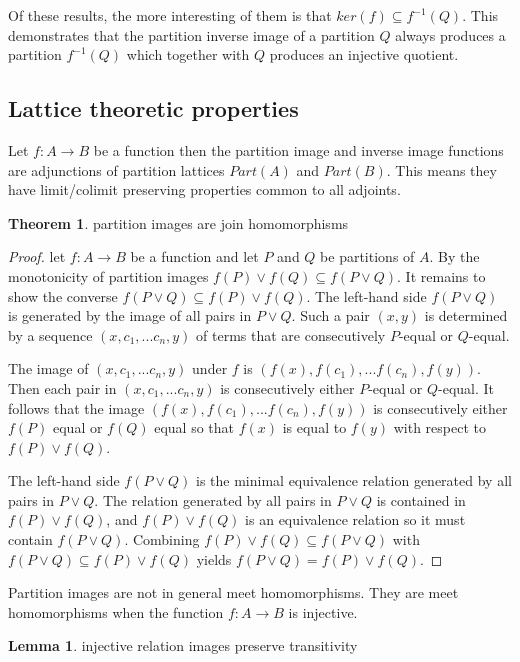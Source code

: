 \documentclass[a4paper,11pt, notitlepage]{report}
\theoremstyle{definition}
\newtheorem{theorem}{Theorem}[section]
\newtheorem{lemma}{Lemma}[section]
\begin{document}
Of these results, the more interesting of them is that $ker(f) \subseteq f^{-1}(Q)$. This demonstrates that the partition inverse image of a partition $Q$ always produces a partition $f^{-1}(Q)$ which together with $Q$ produces an injective quotient.

\subsection{Lattice theoretic properties}
Let $f: A \to B$ be a function then the partition image and inverse image functions are adjunctions of partition lattices $Part(A)$ and $Part(B)$. This means they have limit/colimit preserving properties common to all adjoints.

\begin{theorem}
partition images are join homomorphisms
\end{theorem}

\begin{proof}
let $f: A \to B$ be a function and let $P$ and $Q$ be partitions of $A$. By the monotonicity of partition images $f(P) \vee f(Q) \subseteq f(P \vee Q)$. It remains to show the converse $f(P \vee Q) \subseteq f(P) \vee f(Q)$. The left-hand side $f(P \vee Q)$ is generated by the image of all pairs in $P \vee Q$. Such a pair $(x,y)$ is determined by a sequence $(x,c_1,...c_n,y)$ of terms that are consecutively $P$-equal or $Q$-equal.

The image of $(x,c_1,...c_n,y)$ under $f$ is $(f(x),f(c_1),...f(c_n),f(y))$. Then each pair in $(x,c_1,...c_n,y)$ is consecutively either $P$-equal or $Q$-equal. It follows that the image $(f(x),f(c_1),...f(c_n),f(y))$ is consecutively either $f(P)$ equal or $f(Q)$ equal so that $f(x)$ is equal to $f(y)$ with respect to $f(P) \vee f(Q)$.

The left-hand side $f(P \vee Q)$ is the minimal equivalence relation generated by all pairs in $P \vee Q$. The relation generated by all pairs in $P \vee Q$ is contained in $f(P) \vee f(Q)$, and $f(P) \vee f(Q)$ is an equivalence relation so it must contain $f(P \vee Q)$. Combining $f(P) \vee f(Q) \subseteq f(P \vee Q)$ with $f(P \vee Q) \subseteq f(P) \vee f(Q)$ yields $f(P \vee Q) = f(P) \vee f(Q)$.
\end{proof}

Partition images are not in general meet homomorphisms. They are meet homomorphisms when the function $f:A \to B$ is injective.

\begin{lemma}
injective relation images preserve transitivity
\end{lemma}
\end{document}
